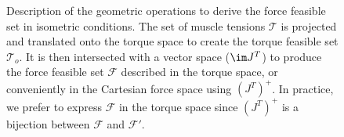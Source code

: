 \begin{figure}[!ht]
    \centering
    \captionsetup{justification=centering}
    \caption{Description of the geometric operations to derive the force feasible set in isometric conditions. The set of muscle tensions $\mathcal{T}$ is projected and translated onto the torque space to create the torque feasible set $\mathcal{T}_o$. It is then intersected with a vector space ($\im J^T$) to produce the force feasible set $\mathcal{F}$ described in the torque space, or conveniently in the Cartesian force space using $(J^T)^+$. In practice, we prefer to express $\mathcal{F}$ in the torque space since $(J^T)^+$ is a bijection between $\mathcal{F}$ and $\mathcal{F}'$.}
    \label{fig:formula_}
\end{figure}

